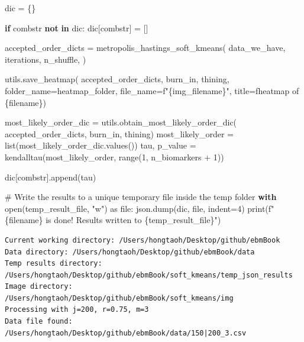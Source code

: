\documentclass[
  letterpaper,
  DIV=11,
  numbers=noendperiod]{scrreprt}
\newenvironment{Shaded}{\begin{snugshade}}{\end{snugshade}}
\newcommand{\BuiltInTok}[1]{\textcolor[rgb]{0.00,0.23,0.31}{#1}}
\newcommand{\CommentTok}[1]{\textcolor[rgb]{0.37,0.37,0.37}{#1}}
\newcommand{\ControlFlowTok}[1]{\textcolor[rgb]{0.00,0.23,0.31}{\textbf{#1}}}
\newcommand{\DecValTok}[1]{\textcolor[rgb]{0.68,0.00,0.00}{#1}}
\newcommand{\ImportTok}[1]{\textcolor[rgb]{0.00,0.46,0.62}{#1}}
\newcommand{\KeywordTok}[1]{\textcolor[rgb]{0.00,0.23,0.31}{\textbf{#1}}}
\newcommand{\NormalTok}[1]{\textcolor[rgb]{0.00,0.23,0.31}{#1}}
\newcommand{\OperatorTok}[1]{\textcolor[rgb]{0.37,0.37,0.37}{#1}}
\newcommand{\SpecialCharTok}[1]{\textcolor[rgb]{0.37,0.37,0.37}{#1}}
\newcommand{\SpecialStringTok}[1]{\textcolor[rgb]{0.13,0.47,0.30}{#1}}
\newcommand{\StringTok}[1]{\textcolor[rgb]{0.13,0.47,0.30}{#1}}
\begin{document}
\begin{Shaded}
\begin{Highlighting}[]
\NormalTok{    dic }\OperatorTok{=}\NormalTok{ \{\}}

    \ControlFlowTok{if}\NormalTok{ combstr }\KeywordTok{not} \KeywordTok{in}\NormalTok{ dic:}
\NormalTok{        dic[combstr] }\OperatorTok{=}\NormalTok{ []}

\NormalTok{    accepted\_order\_dicts }\OperatorTok{=}\NormalTok{ metropolis\_hastings\_soft\_kmeans(}
\NormalTok{        data\_we\_have,}
\NormalTok{        iterations,}
\NormalTok{        n\_shuffle,}
\NormalTok{    )}

\NormalTok{    utils.save\_heatmap(}
\NormalTok{        accepted\_order\_dicts,}
\NormalTok{        burn\_in, }
\NormalTok{        thining, }
\NormalTok{        folder\_name}\OperatorTok{=}\NormalTok{heatmap\_folder,}
\NormalTok{        file\_name}\OperatorTok{=}\SpecialStringTok{f"}\SpecialCharTok{\{}\NormalTok{img\_filename}\SpecialCharTok{\}}\SpecialStringTok{"}\NormalTok{, }
\NormalTok{        title}\OperatorTok{=}\SpecialStringTok{f\textquotesingle{}heatmap of }\SpecialCharTok{\{}\NormalTok{filename}\SpecialCharTok{\}}\SpecialStringTok{\textquotesingle{}}\NormalTok{)}
    
\NormalTok{    most\_likely\_order\_dic }\OperatorTok{=}\NormalTok{ utils.obtain\_most\_likely\_order\_dic(}
\NormalTok{        accepted\_order\_dicts, burn\_in, thining)}
\NormalTok{    most\_likely\_order }\OperatorTok{=} \BuiltInTok{list}\NormalTok{(most\_likely\_order\_dic.values())}
\NormalTok{    tau, p\_value }\OperatorTok{=}\NormalTok{ kendalltau(most\_likely\_order, }\BuiltInTok{range}\NormalTok{(}\DecValTok{1}\NormalTok{, n\_biomarkers }\OperatorTok{+} \DecValTok{1}\NormalTok{))}
    
\NormalTok{    dic[combstr].append(tau)}
    
    \CommentTok{\# Write the results to a unique temporary file inside the temp folder}
    \ControlFlowTok{with} \BuiltInTok{open}\NormalTok{(temp\_result\_file, }\StringTok{"w"}\NormalTok{) }\ImportTok{as} \BuiltInTok{file}\NormalTok{:}
\NormalTok{        json.dump(dic, }\BuiltInTok{file}\NormalTok{, indent}\OperatorTok{=}\DecValTok{4}\NormalTok{)}
    \BuiltInTok{print}\NormalTok{(}\SpecialStringTok{f"}\SpecialCharTok{\{}\NormalTok{filename}\SpecialCharTok{\}}\SpecialStringTok{ is done! Results written to }\SpecialCharTok{\{}\NormalTok{temp\_result\_file}\SpecialCharTok{\}}\SpecialStringTok{"}\NormalTok{)}
\end{Highlighting}
\end{Shaded}

\begin{verbatim}
Current working directory: /Users/hongtaoh/Desktop/github/ebmBook
Data directory: /Users/hongtaoh/Desktop/github/ebmBook/data
Temp results directory: /Users/hongtaoh/Desktop/github/ebmBook/soft_kmeans/temp_json_results
Image directory: /Users/hongtaoh/Desktop/github/ebmBook/soft_kmeans/img
Processing with j=200, r=0.75, m=3
Data file found: /Users/hongtaoh/Desktop/github/ebmBook/data/150|200_3.csv
\end{verbatim}
\end{document}
